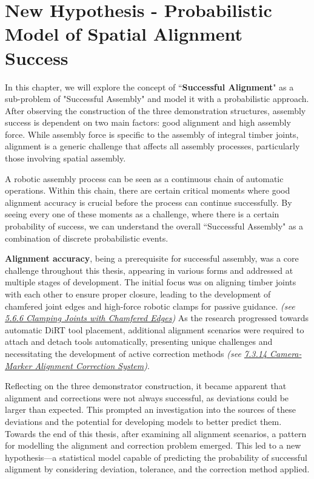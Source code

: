 \chapter{New Hypothesis - Probabilistic Model of Spatial Alignment Success}

In this chapter, we will explore the concept of ``\textbf{Successful Alignment}" as a sub-problem of "Successful Assembly" and model it with a probabilistic approach. After observing the construction of the three demonstration structures, assembly success is dependent on two main factors: good alignment and high assembly force. While assembly force is specific to the assembly of integral timber joints, alignment is a generic challenge that affects all assembly processes, particularly those involving spatial assembly.

A robotic assembly process can be seen as a continuous chain of automatic operations. Within this chain, there are certain critical moments where good alignment accuracy is crucial before the process can continue successfully. By seeing every one of these moments as a challenge, where there is a certain probability of success, we can understand the overall ``Successful Assembly" as a combination of discrete probabilistic events.

\textbf{Alignment accuracy}, being a prerequisite for successful assembly, was a core challenge throughout this thesis, appearing in various forms and addressed at multiple stages of development. The initial focus was on aligning timber joints with each other to ensure proper closure, leading to the development of chamfered joint edges and high-force robotic clamps for passive guidance. \textit{(see \ul{5.6.6 Clamping Joints with Chamfered Edges})} As the research progressed towards automatic DiRT tool placement, additional alignment scenarios were required to attach and detach tools automatically, presenting unique challenges and necessitating the development of active correction methods \textit{(see \ul{7.3.14 Camera-Marker Alignment Correction System})}.

Reflecting on the three demonstrator construction, it became apparent that alignment and corrections were not always successful, as deviations could be larger than expected. This prompted an investigation into the sources of these deviations and the potential for developing models to better predict them. Towards the end of this thesis, after examining all alignment scenarios, a pattern for modelling the alignment and correction problem emerged. This led to a new hypothesis—a statistical model capable of predicting the probability of successful alignment by considering deviation, tolerance, and the correction method applied.

